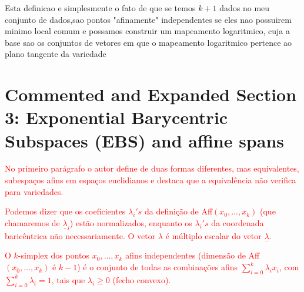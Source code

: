 \documentclass[a4paper,titlepage]{article}
\newcommand{\juliana}[1]{\textcolor{red}{#1}}
\begin{document}
\begin{center}
\vspace{1em}
\vspace{1em}
\end{center}

Esta definicao e simplesmente o fato de que se temos $k+1$ dados no meu conjunto de dados,sao pontos "afinamente" independentes se eles nao possuirem minimo local comum e possamos construir um mapeamento logaritmico, cuja a base sao os conjuntos de vetores em que o mapeamento logaritmico pertence ao plano tangente da variedade
\section{Commented and Expanded Section 3: Exponential Barycentric Subspaces
(EBS) and affine spans}
{
\vspace{1em}
\vspace{1em}
}

\juliana{No primeiro parágrafo o autor define de duas formas diferentes, mas equivalentes, subespaços afins em espaços euclidianos e destaca que a equivalência não verifica para variedades.}

\juliana{Podemos dizer que os coeficientes $\lambda_i's$ da definição de Aff$(x_0 ,..., x_k)$ (que chamaremos de $\underline{\lambda}_i$) estão normalizados, enquanto os $\lambda_i's$ da coordenada baricêntrica não necessariamente. O vetor $\lambda$ é múltiplo escalar do vetor $\underline{\lambda}$.} 

\juliana{O $k$-simplex dos pontos $x_0, ..., x_k$ afins independentes (dimensão de Aff$(x_0 ,..., x_k)$ é $k-1$) é o conjunto de todas as combinações afins $\sum_{i=0}^k \lambda_i x_i$, com $\sum_{i=0}^k \lambda_i=1$, tais que $\lambda_i \geq 0$ (fecho convexo).}
\end{document}

